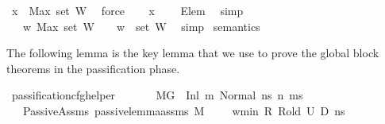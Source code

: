 \begin{isabellebody}
\ {\isachardoublequoteopen}x\ {\isasymle}\ Max\ {\isacharparenleft}{\kern0pt}set\ W{\isacharparenright}{\kern0pt}{\isachardoublequoteclose}\ \isamarkupfalse%
\ force\isanewline
\ \ \isamarkupfalse%
\ {\isachardoublequoteopen}x\ {\isasymin}\ {\isacharbraceleft}{\kern0pt}{\isacharbraceright}{\kern0pt}{\isachardoublequoteclose}\ \isamarkupfalse%
\ Elem{}\ \isamarkupfalse%
\ simp\isanewline
{}\isamarkupfalse%
\isanewline
\ \ \isamarkupfalse%
\ {\isachardoublequoteopen}{\isacharbraceleft}{\kern0pt}{\isacharbraceright}{\kern0pt}\ {\isasymsubseteq}\ {\isacharbraceleft}{\kern0pt}w{\isachardot}{\kern0pt}\ Max\ {\isacharparenleft}{\kern0pt}set\ W{\isacharparenright}{\kern0pt}\ {\isacharplus}{\kern0pt}\ {}\ {\isasymle}\ w{\isacharbraceright}{\kern0pt}\ {\isasyminter}\ set\ W{\isachardoublequoteclose}\ \isamarkupfalse%
\ simp\isanewline
{}\isamarkupfalse%
%
\endisatagproof
{\isafoldproof}%
%
\isadelimproof
\isanewline
%
\endisadelimproof
\isanewline
\isanewline
{}\isamarkupfalse%
\ semantics\ %
\begin{isamarkuptext}%
The following lemma is the key lemma that we use to prove the global block theorems in the
passification phase.%
\end{isamarkuptext}\isamarkuptrue%
\isamarkupfalse%
\ passification{\isacharunderscore}{\kern0pt}cfg{\isacharunderscore}{\kern0pt}helper{\isacharcolon}{\kern0pt}\isanewline
\ \ \ \isanewline
\ \ \ {\isachardoublequoteopen}M{\isacharcomma}{\kern0pt}{\isasymLambda}{}{\isacharcomma}{\kern0pt}{\isasymGamma}{\isacharcomma}{\kern0pt}{\isasymOmega}{\isacharcomma}{\kern0pt}G{}\ {\isasymturnstile}\ {\isacharparenleft}{\kern0pt}{\isacharparenleft}{\kern0pt}Inl\ m{\isacharparenright}{\kern0pt}{\isacharcomma}{\kern0pt}\ Normal\ ns{\isacharparenright}{\kern0pt}\ {\isacharminus}{\kern0pt}n{\isasymrightarrow}{\isacharasterisk}{\kern0pt}\ {\isacharparenleft}{\kern0pt}m{\isacharprime}{\kern0pt}{\isacharcomma}{\kern0pt}s{\isacharprime}{\kern0pt}{\isacharparenright}{\kern0pt}{\isachardoublequoteclose}\ \isanewline
\ \ \ PassiveAssms{\isacharcolon}{\kern0pt}\ {\isachardoublequoteopen}passive{\isacharunderscore}{\kern0pt}lemma{\isacharunderscore}{\kern0pt}assms{\isacharunderscore}{\kern0pt}{}\ M\ {\isasymLambda}{}\ {\isasymLambda}{}\ {\isasymGamma}\ {\isasymOmega}\ w{\isacharunderscore}{\kern0pt}min\ R\ R{\isacharunderscore}{\kern0pt}old\ U{}\ D{}\ ns{\isachardoublequoteclose}\ \isanewline

\end{isabellebody}
